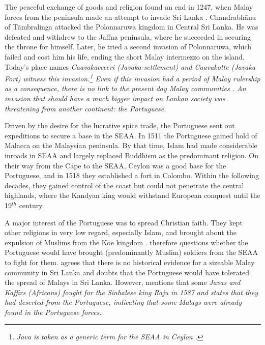 The peaceful exchange of goods and religion found an end in
1247, when Malay forces from the peninsula made an attempt
to invade Sri Lanka \citep[67]{Desilva1981}. Chandrabh\=anu of T\=ambralinga attacked the Polonnaruwa kingdom in Central Sri Lanka. He was defeated and withdrew to the Jaffna peninsula, where he succeeded in securing the throne for himself. Later, he tried a second invasion of Polonnaruwa, which failed and cost him his life, ending the short Malay intermezzo on the island. Today's
place names \em Caavakacceeri \em (Javaka-settlement) and Caavakotte (Javaka
Fort) witness this invasion.\footnote{\em Java \em is taken as a
generic term for the SEAA in Ceylon \citep[37]{Hussainmiya1987}.} Even if this invasion
had a period of Malay rulership as a consequence, there is no link to the present day Malay communities \citep[cf.][685]{AdelaarEtAl1996}. An invasion that should have a much bigger impact on Lankan society was threatening from another continent: the Portuguese.


 
Driven by the desire for the lucrative spice trade, the Portuguese sent out expeditions to secure a base in the SEAA. In 1511 the Portuguese gained hold of Malacca on the Malaysian peninsula. By that time, Islam had made considerable inroads in SEAA and largely replaced Buddhism as the predominant religion. On their way from the Cape to the SEAA, Ceylon was a good base for the Portuguese, and in 1518  they established a fort in Colombo. Within the following decades, they gained control of the coast but could not penetrate the central highlands, where the Kandyan king would withstand European conquest until the 19$^{th}$ century.

A major interest of the Portuguese was to spread Christian faith.
They kept other religions in very low regard, especially Islam, and brought about the expulsion of Muslims from the K\=o\dott\dott e kingdom \citep[102]{Desilva1981}.
\citet[34f]{Hussainmiya1990} therefore questions whether the Portuguese would have
brought (predominantly Muslim) soldiers from the SEAA to fight for
them. \citet[6f.]{Bichsel} agrees that there is no historical
evidence for a sizeable Malay community in Sri Lanka and doubts
that the Portuguese would have tolerated the spread of Malays in
Sri Lanka.  However, \citet[26]{Powell1973} mentions that some \em
Javas \em  and \em Kaffirs \em (Africans) fought for the
Sinhalese king Raju in 1587 and states that they had deserted from
the Portuguese, indicating that some Malays were already found in the Portuguese forces.

